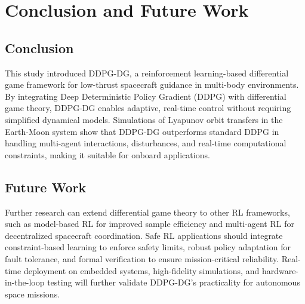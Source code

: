 \documentclass[conference]{IEEEtran}
\begin{document}


\section{Conclusion and Future Work}

\subsection{Conclusion}

This study introduced DDPG-DG, a reinforcement learning-based differential game framework for low-thrust spacecraft guidance in multi-body environments. By integrating Deep Deterministic Policy Gradient (DDPG) with differential game theory, DDPG-DG enables adaptive, real-time control without requiring simplified dynamical models. Simulations of Lyapunov orbit transfers in the Earth-Moon system show that DDPG-DG outperforms standard DDPG in handling multi-agent interactions, disturbances, and real-time computational constraints, making it suitable for onboard applications.

\subsection{Future Work}

Further research can extend differential game theory to other RL frameworks, such as model-based RL for improved sample efficiency and multi-agent RL for decentralized spacecraft coordination. Safe RL applications should integrate constraint-based learning to enforce safety limits, robust policy adaptation for fault tolerance, and formal verification to ensure mission-critical reliability. Real-time deployment on embedded systems, high-fidelity simulations, and hardware-in-the-loop testing will further validate DDPG-DG’s practicality for autonomous space missions.





\end{document}
